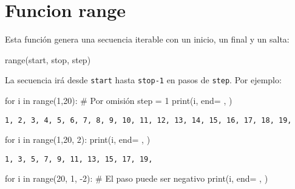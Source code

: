 \documentclass[
  letterpaper,
  DIV=11,
  numbers=noendperiod]{scrreprt}
\newenvironment{Shaded}{\begin{snugshade}}{\end{snugshade}}
\newcommand{\BuiltInTok}[1]{\textcolor[rgb]{0.00,0.23,0.31}{#1}}
\newcommand{\CommentTok}[1]{\textcolor[rgb]{0.37,0.37,0.37}{#1}}
\newcommand{\ControlFlowTok}[1]{\textcolor[rgb]{0.00,0.23,0.31}{#1}}
\newcommand{\DecValTok}[1]{\textcolor[rgb]{0.68,0.00,0.00}{#1}}
\newcommand{\KeywordTok}[1]{\textcolor[rgb]{0.00,0.23,0.31}{#1}}
\newcommand{\NormalTok}[1]{\textcolor[rgb]{0.00,0.23,0.31}{#1}}
\newcommand{\OperatorTok}[1]{\textcolor[rgb]{0.37,0.37,0.37}{#1}}
\newcommand{\StringTok}[1]{\textcolor[rgb]{0.13,0.47,0.30}{#1}}
\begin{document}
\section{Funcion range}\label{funcion-range}

Esta función genera una secuencia iterable con un inicio, un final y un
salta:

\begin{Shaded}
\begin{Highlighting}[]
\BuiltInTok{range}\NormalTok{(start, stop, step)}
\end{Highlighting}
\end{Shaded}

La secuencia irá desde \texttt{start} hasta \texttt{stop-1} en pasos de
\texttt{step}. Por ejemplo:

\begin{Shaded}
\begin{Highlighting}[]
\ControlFlowTok{for}\NormalTok{ i }\KeywordTok{in} \BuiltInTok{range}\NormalTok{(}\DecValTok{1}\NormalTok{,}\DecValTok{20}\NormalTok{): }\CommentTok{\# Por omisión step = 1}
    \BuiltInTok{print}\NormalTok{(i, end}\OperatorTok{=} \StringTok{\textquotesingle{}, \textquotesingle{}}\NormalTok{)}
\end{Highlighting}
\end{Shaded}

\begin{verbatim}
1, 2, 3, 4, 5, 6, 7, 8, 9, 10, 11, 12, 13, 14, 15, 16, 17, 18, 19, 
\end{verbatim}

\begin{Shaded}
\begin{Highlighting}[]
\ControlFlowTok{for}\NormalTok{ i }\KeywordTok{in} \BuiltInTok{range}\NormalTok{(}\DecValTok{1}\NormalTok{,}\DecValTok{20}\NormalTok{, }\DecValTok{2}\NormalTok{):}
    \BuiltInTok{print}\NormalTok{(i, end}\OperatorTok{=} \StringTok{\textquotesingle{}, \textquotesingle{}}\NormalTok{)}
\end{Highlighting}
\end{Shaded}

\begin{verbatim}
1, 3, 5, 7, 9, 11, 13, 15, 17, 19, 
\end{verbatim}

\begin{Shaded}
\begin{Highlighting}[]
\ControlFlowTok{for}\NormalTok{ i }\KeywordTok{in} \BuiltInTok{range}\NormalTok{(}\DecValTok{20}\NormalTok{, }\DecValTok{1}\NormalTok{, }\OperatorTok{{-}}\DecValTok{2}\NormalTok{): }\CommentTok{\# El paso puede ser negativo}
    \BuiltInTok{print}\NormalTok{(i, end}\OperatorTok{=} \StringTok{\textquotesingle{}, \textquotesingle{}}\NormalTok{)}
\end{Highlighting}
\end{Shaded}
\end{document}
